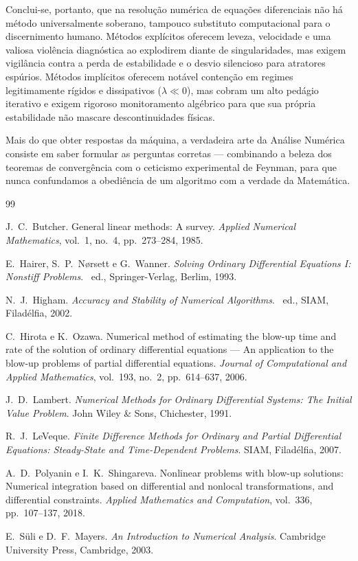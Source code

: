 \documentclass[12pt, a4paper]{article}
\begin{document}
Conclui-se, portanto, que na resolução numérica de equações diferenciais não há método universalmente soberano, tampouco substituto computacional para o discernimento humano. Métodos explícitos oferecem leveza, velocidade e uma valiosa violência diagnóstica ao explodirem diante de singularidades, mas exigem vigilância contra a perda de estabilidade e o desvio silencioso para atratores espúrios. Métodos implícitos oferecem notável contenção em regimes legitimamente rígidos e dissipativos ($\lambda \ll 0$), mas cobram um alto pedágio iterativo e exigem rigoroso monitoramento algébrico para que sua própria estabilidade não mascare descontinuidades físicas. 

Mais do que obter respostas da máquina, a verdadeira arte da Análise Numérica consiste em saber formular as perguntas corretas — combinando a beleza dos teoremas de convergência com o ceticismo experimental de Feynman, para que nunca confundamos a obediência de um algoritmo com a verdade da Matemática.

\begin{thebibliography}{99}

J.~C.~Butcher.
\newblock General linear methods: A survey.
\newblock \emph{Applied Numerical Mathematics}, vol.~1, no.~4, pp.~273--284, 1985.

E.~Hairer, S.~P.~Nørsett e G.~Wanner.
\newblock \emph{Solving Ordinary Differential Equations I: Nonstiff Problems}.
\textordfeminine~ed., Springer-Verlag, Berlim, 1993.

N.~J.~Higham.
\newblock \emph{Accuracy and Stability of Numerical Algorithms}.
\textordfeminine~ed., SIAM, Filadélfia, 2002.

C.~Hirota e K.~Ozawa.
\newblock Numerical method of estimating the blow-up time and rate of the solution of ordinary differential equations --- An application to the blow-up problems of partial differential equations.
\newblock \emph{Journal of Computational and Applied Mathematics}, vol.~193, no.~2, pp.~614--637, 2006.

J.~D.~Lambert.
\newblock \emph{Numerical Methods for Ordinary Differential Systems: The Initial Value Problem}.
\newblock John Wiley \& Sons, Chichester, 1991.

R.~J.~LeVeque.
\newblock \emph{Finite Difference Methods for Ordinary and Partial Differential Equations: Steady-State and Time-Dependent Problems}.
\newblock SIAM, Filadélfia, 2007.

A.~D.~Polyanin e I.~K.~Shingareva.
\newblock Nonlinear problems with blow-up solutions: Numerical integration based on differential and nonlocal transformations, and differential constraints.
\newblock \emph{Applied Mathematics and Computation}, vol.~336, pp.~107--137, 2018.

E.~Süli e D.~F.~Mayers.
\newblock \emph{An Introduction to Numerical Analysis}.
\newblock Cambridge University Press, Cambridge, 2003.

\end{thebibliography}
\end{document}
